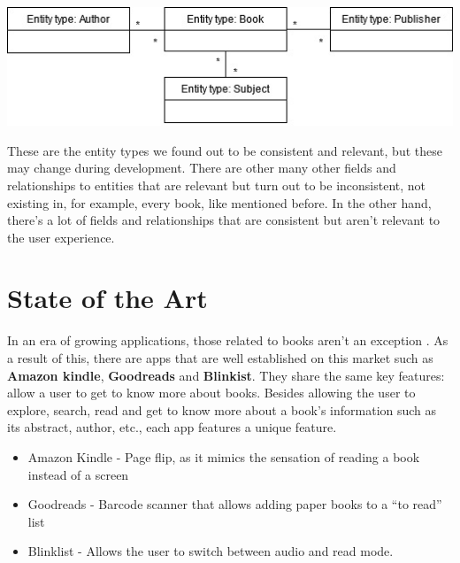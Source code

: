 \documentclass[twocolumn,twoside,11pt,a4paper]{article}
\begin{document}
\begin{dataFigure}
    \centering\includegraphics[width=1.0\linewidth]{dataModel.jpg}
\end{dataFigure}

These are the entity types we found out to be consistent and relevant, but these may change during development. There are other many other fields and relationships to entities that are relevant but turn out to be inconsistent, not existing in, for example, every book, like mentioned before. In the other hand, there's a lot of fields and relationships that are consistent but aren't relevant to the user experience.


\section{State of the Art}\label{sec:conclusions}

 In an era of growing applications, those related to books aren’t an exception \cite{bookApps}. As a result of this, there are apps that are well established on this market such as  \textbf{Amazon kindle}, \textbf{Goodreads} and \textbf{Blinkist}. They share the same key features: allow a user to get to know more about books. Besides allowing the user to explore, search, read and get to know more about a book’s information such as its abstract, author, etc., each app features a unique feature.

\begin{itemize}
    \item Amazon Kindle - Page flip, as it mimics the sensation of reading a book instead of a screen \cite{amazonKindle}
    \item Goodreads - Barcode scanner that allows adding paper books to a “to read” list \cite{goodreads}
    \item Blinklist - Allows the user to switch between audio and read mode. \cite{blinklist}
\end{itemize}

\end{document}
